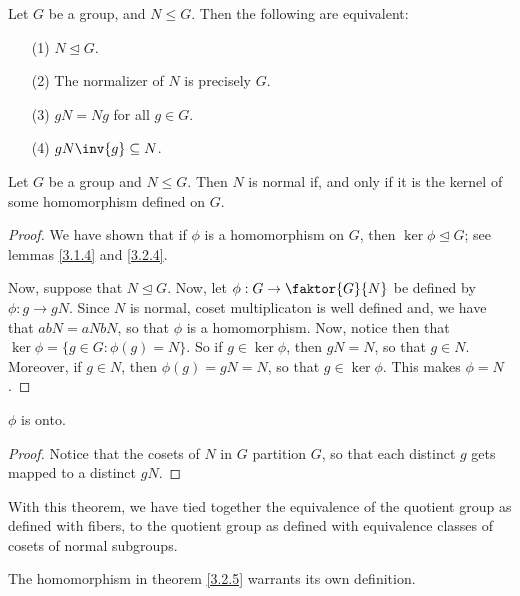 \begin{lemma}\label{3.2.4}
    Let $G$ be a group, and  $N \leq G$. Then the following are equivalent:
    \begin{enumerate}
        \item[(1)] $N \unlhd G$.

        \item [(2)] The normalizer of $N$ is precisely  $G$.

        \item[(3)] $gN=Ng$ for all  $g \in G$.

        \item [(4)] $gN\inv{g} \subseteq N$.
    \end{enumerate}
\end{lemma}

\begin{theorem}\label{3.2.5}
    Let $G$ be a group and  $N \leq G$. Then  $N$ is normal if, and only if it
    is the kernel of some homomorphism defined on $G$.
\end{theorem}
\begin{proof}
    We have shown that if $\phi$ is a homomorphism on  $G$, then  $\ker{\phi}
    \unlhd G$; see lemmas \ref{3.1.4} and \ref{3.2.4}.

    Now, suppose that $N \unlhd G$. Now, let $\phi:G \rightarrow \faktor{G}{N}$
    be defined by $\phi:g \rightarrow gN$. Since $N$ is normal, coset
    multiplicaton is well defined and, we have that $abN=aNbN$, so that $\phi$
    is a homomorphism. Now, notice then that
    $\ker{\phi}=\{g \in G : \phi(g)=N\}$. So if $g \in \ker{\phi}$, then $gN=N$,
    so that $g \in N$. Moreover, if  $g \in N$, then  $\phi(g)=gN=N$, so that $g
    \in \ker{\phi}$. This makes $\phi=N$.
\end{proof}
\begin{corollary}
    $\phi$ is onto.
\end{corollary}
\begin{proof}
    Notice that the cosets of $N$ in  $G$ partition  $G$, so that each distinct
    $g$ gets mapped to a distinct $gN$.
\end{proof}
\begin{remark}
    With this theorem, we have tied together the equivalence of the quotient
    group as defined with fibers, to the quotient group as defined with
    equivalence classes of cosets of normal subgroups.
\end{remark}

The homomorphism in theorem \ref{3.2.5} warrants its own definition.

